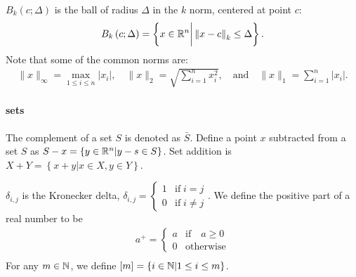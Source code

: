 $B_k\left(c; \Delta\right)$ is the ball of radius $\Delta$ in the $k$ norm, centered at point $c$:
\begin{align}
\label{define_ball}
	B_k\left(c; \Delta\right) = \left\{x \in \mathbb R^n \bigg | \left\|x - c\right\|_k \le \Delta \right\}.
\end{align}
Note that some of the common norms are:
\begin{align*}
\|x\|_{\infty} = \max_{1\le i\le n}|x_i|, \quad
\|x\|_{2} = \sqrt{\sum_{i=1}^n x_i^2}, \quad \textrm{and} \quad
\|x\|_1 = \sum_{i = 1}^n |x_i|.
\end{align*}

\paragraph*{sets}
The complement of a set $S$ is denoted as $\bar S$.
Define a point $x$ subtracted from a set $S$ as $S - x = \left\{y \in \mathbb R^n | y - s \in S\right\}$.
Set addition is $X + Y = \left\{x + y | x \in X, y \in Y\right\}$.

$\delta_{i,j}$ is the Kronecker delta, $\delta_{i, j} = \begin{cases} 1 & \textrm{if} \; i = j \\ 0 & \textrm{if} \; i \ne j \end{cases}$.
We define the positive part of a real number to be
\begin{align*}
a^+ = \begin{cases} a & \textrm{if} \quad a \ge 0 \\ 0 & \textrm{otherwise} \end{cases}\\
\end{align*}
For any $m \in \mathbb N$, we define $[m] = \left\{i \in \mathbb N | 1 \le i \le m\right\}$.








